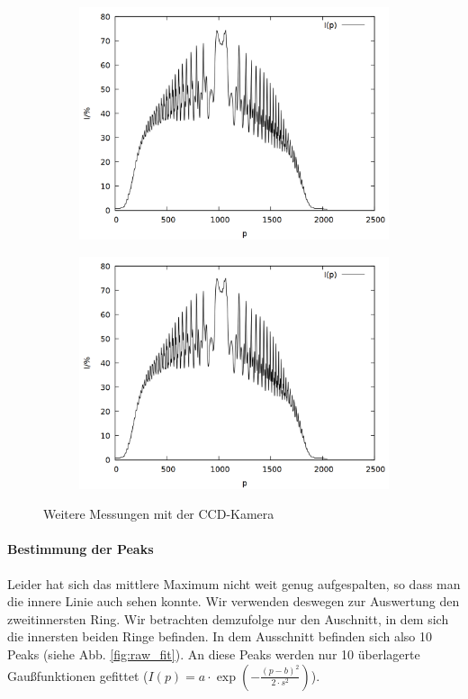 \begin{figure}
\begin{subfigure}{0.45\textwidth}
\includegraphics[width=\textwidth]{data/zeeman/out_8_4_raw.png}
\end{subfigure}
\begin{subfigure}{0.45\textwidth}
\includegraphics[width=\textwidth]{data/zeeman/out_8_5_raw.png}
\end{subfigure}
\caption{Weitere Messungen mit der CCD-Kamera}
\label{fig:raw}
\end{figure}

\paragraph{Bestimmung der Peaks}
Leider hat sich das mittlere Maximum nicht weit genug aufgespalten, so dass man die innere Linie auch sehen konnte. Wir verwenden deswegen zur Auswertung den zweitinnersten Ring. Wir betrachten demzufolge nur den Auschnitt, in dem sich die innersten beiden Ringe befinden. In dem Ausschnitt befinden sich also 10 Peaks (siehe Abb. \ref{fig:raw_fit}). An diese Peaks werden nur 10 überlagerte Gaußfunktionen gefittet ($I(p) = a\cdot \exp\left(-\frac{(p-b)^2}{2\cdot s^2}\right)$).


